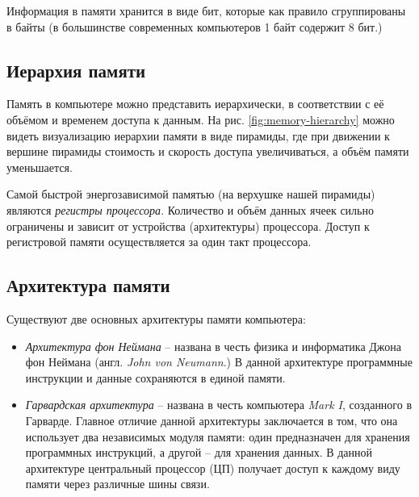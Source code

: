 \documentclass[../sparc.tex]{subfiles}
\begin{document}
Информация в памяти хранится в виде бит, которые как правило сгруппированы в
байты (в большинстве современных компьютеров 1 байт содержит 8 бит.)

\subsection{Иерархия памяти}

Память в компьютере можно представить иерархически, в соответствии с её объёмом
и временем доступа к данным.  На рис. \ref{fig:memory-hierarchy} можно видеть
визуализацию иерархии памяти в виде пирамиды, где при движении к вершине
пирамиды стоимость и скорость доступа увеличиваться, а объём памяти
уменьшается.\cite{branden-ghena:memory-hierarchy}


Самой быстрой энергозависимой памятью (на верхушке нашей пирамиды) являются
\emph{регистры процессора}.  Количество и объём данных ячеек сильно ограничены и
зависит от устройства (архитектуры) процессора.  Доступ к регистровой памяти
осуществляется за один такт процессора.

\subsection{Архитектура памяти}

Существуют две основных архитектуры памяти компьютера:
\begin{itemize}
\item \emph{Архитектура фон Неймана} -- названа в честь физика и информатика
  Джона фон Неймана (англ. \textit{John von Neumann}.)  В данной архитектуре
  программные инструкции и данные сохраняются в единой памяти.
\item \emph{Гарвардская архитектура} -- названа в честь компьютера \emph{Mark I},
  созданного в Гарварде.  Главное отличие данной архитектуры заключается в том,
  что она использует два независимых модуля памяти: один предназначен для
  хранения программных инструкций, а другой -- для хранения данных.  В данной
  архитектуре центральный процессор (ЦП) получает доступ к каждому виду памяти
  через различные шины связи.
\end{itemize}
\end{document}

